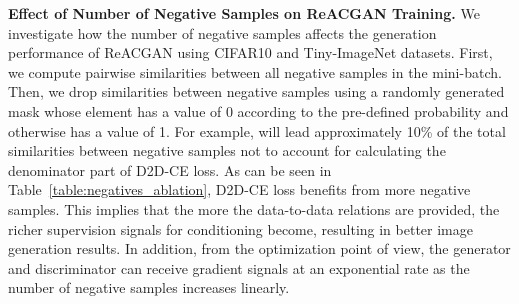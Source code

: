 \documentclass{article}
\begin{document}
\begin{table}[t!]
\centering
\caption{Ablation study on the number of negative samples. FID score~\cite{Heusel2017GANsTB} is used for evaluation.}
\vspace{2mm}
\label{table:negatives_ablation}
\vspace{-2.5mm}
\end{table} \textbf{Effect of Number of Negative Samples on ReACGAN Training.} We investigate how the number of negative samples affects the generation performance of ReACGAN using CIFAR10 and Tiny-ImageNet datasets. First, we compute pairwise similarities between all negative samples in the mini-batch. Then, we drop similarities between negative samples using a randomly generated mask whose element has a value of 0 according to the pre-defined probability  and otherwise has a value of 1. For example,  will lead approximately 10\% of the total similarities between negative samples not to account for calculating the denominator part of D2D-CE loss. As can be seen in Table~\ref{table:negatives_ablation}, D2D-CE loss benefits from more negative samples. This implies that the more the data-to-data relations are provided, the richer supervision signals for conditioning become, resulting in better image generation results. In addition, from the optimization point of view, the generator and discriminator can receive gradient signals at an exponential rate as the number of negative samples increases linearly.
\end{document}
